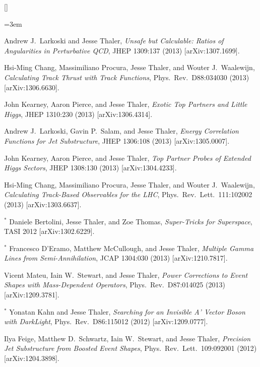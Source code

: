 \begin{list}{[]\addtocounter{jessecount}{-1}}{\leftmargin=3em \itemsep=4pt}
\item
 Andrew J.\ Larkoski and Jesse Thaler,
\emph{Unsafe but Calculable: Ratios of Angularities in Perturbative QCD},
JHEP 1309:137 (2013)
[arXiv:1307.1699].

\item
 Hsi-Ming Chang, Massimiliano Procura, Jesse Thaler, and Wouter J.\ Waalewijn,
\emph{Calculating Track Thrust with Track Functions},
Phys.\ Rev.\ D88:034030 (2013)
[arXiv:1306.6630].

\item
 John Kearney, Aaron Pierce, and Jesse Thaler,
\emph{Exotic Top Partners and Little Higgs},
JHEP 1310:230 (2013)
[arXiv:1306.4314].

\item
 Andrew J.\ Larkoski, Gavin P.\ Salam, and Jesse Thaler,
\emph{Energy Correlation Functions for Jet Substructure},
JHEP 1306:108 (2013)
[arXiv:1305.0007].

\item
 John Kearney, Aaron Pierce, and Jesse Thaler,
\emph{Top Partner Probes of Extended Higgs Sectors},
JHEP 1308:130 (2013)
[arXiv:1304.4233].

\item
 Hsi-Ming Chang, Massimiliano Procura, Jesse Thaler, and Wouter J.\ Waalewijn,
\emph{Calculating Track-Based Observables for the LHC},
Phys.\ Rev.\ Lett.\ 111:102002 (2013)
[arXiv:1303.6637].

\item
${}^\ast$ Daniele Bertolini, Jesse Thaler, and Zoe Thomas,
\emph{Super-Tricks for Superspace},
TASI 2012
[arXiv:1302.6229].

\item
${}^\ast$ Francesco D'Eramo, Matthew McCullough, and Jesse Thaler,
\emph{Multiple Gamma Lines from Semi-Annihilation},
JCAP 1304:030 (2013)
[arXiv:1210.7817].

\item
 Vicent Mateu, Iain W.\ Stewart, and Jesse Thaler,
\emph{Power Corrections to Event Shapes with Mass-Dependent Operators},
Phys.\ Rev.\ D87:014025 (2013)
[arXiv:1209.3781].

\item
${}^\ast$ Yonatan Kahn and Jesse Thaler,
\emph{Searching for an Invisible A' Vector Boson with DarkLight},
Phys.\ Rev.\ D86:115012 (2012)
[arXiv:1209.0777].

\item
 Ilya Feige, Matthew D.\ Schwartz, Iain W.\ Stewart, and Jesse Thaler,
\emph{Precision Jet Substructure from Boosted Event Shapes},
Phys.\ Rev.\ Lett.\ 109:092001 (2012)
[arXiv:1204.3898].


\end{list}
